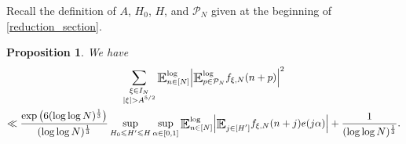 \documentclass[letter,11pt]{article}
\theoremstyle{plain} %
\newtheorem{proposition}[theorem]{Proposition}
\theoremstyle{definition} %
\theoremstyle{plain}
\theoremstyle{plain}
\theoremstyle{plain}
\numberwithin{equation}{section}
\renewcommand{\leq}{\leqslant}
\newcommand{\E}{\raisebox{-0.4ex}{\scalebox{1.4}[1.3]{$\mathbb{E}$}}}
\newcommand{\Esub}[1]{\raisebox{-0.4ex}{\scalebox{1.4}[1.3]{$\mathbb{E}$}}\raisebox{-0.35ex}{\ensuremath{_{\scriptstyle #1}}}}
\newcommand{\logE}{{\E}^{\log}}
\newcommand{\1}{\mathbbm{1}}
\newcommand{\f}{f_{\xi,N}}
\newcommand{\Pc}{\mathcal{P}}
\begin{document}
Recall the definition of $A$, $H_0$, $H$, and $\Pc_N$ given at the beginning of \cref{reduction_section}.

\begin{proposition}\label{bound_by_local_Fourier_unif}
We have
\begin{multline*}
    \sum_{\substack{\xi\in I_N \\ |\xi|>A^{5/2}}} \logE_{n\in[N]}\Big|\logE_{p\in\Pc_N}\f(n+p)\Big|^2 \\
    \ll \frac{\exp\big(6(\log\log{N})^\frac{1}{3}\big)}{(\log\log{N})^\frac{1}{3}}\sup_{H_0\leq H'\leq H}\sup_{\alpha\in[0,1]}\logE_{n\in[N]}\Big|\Esub{j\in[H']}\f(n+j)e(j\alpha)\Big| + \frac{1}{(\log\log{N})^\frac{1}{3}}.
\end{multline*}
\end{proposition}
\end{document}
